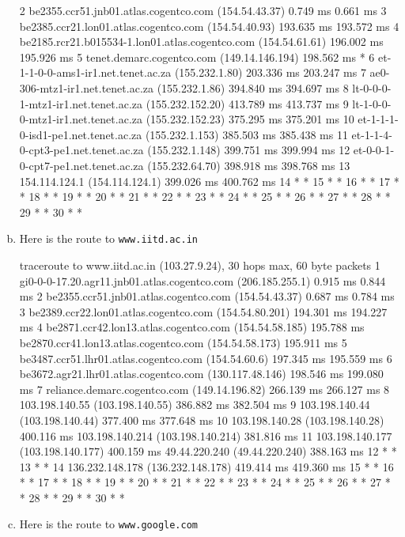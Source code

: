 \documentclass{article}
\begin{document}
\begin{enumerate}[a.]
\begin{code}
 2  be2355.ccr51.jnb01.atlas.cogentco.com (154.54.43.37)  0.749 ms  0.661 ms
 3  be2385.ccr21.lon01.atlas.cogentco.com (154.54.40.93)  193.635 ms  193.572 ms
 4  be2185.rcr21.b015534-1.lon01.atlas.cogentco.com (154.54.61.61)  196.002 ms  195.926 ms
 5  tenet.demarc.cogentco.com (149.14.146.194)  198.562 ms *
 6  et-1-1-0-0-ams1-ir1.net.tenet.ac.za (155.232.1.80)  203.336 ms  203.247 ms
 7  ae0-306-mtz1-ir1.net.tenet.ac.za (155.232.1.86)  394.840 ms  394.697 ms
 8  lt-0-0-0-1-mtz1-ir1.net.tenet.ac.za (155.232.152.20)  413.789 ms  413.737 ms
 9  lt-1-0-0-0-mtz1-ir1.net.tenet.ac.za (155.232.152.23)  375.295 ms  375.201 ms
10  et-1-1-1-0-isd1-pe1.net.tenet.ac.za (155.232.1.153)  385.503 ms  385.438 ms
11  et-1-1-4-0-cpt3-pe1.net.tenet.ac.za (155.232.1.148)  399.751 ms  399.994 ms
12  et-0-0-1-0-cpt7-pe1.net.tenet.ac.za (155.232.64.70)  398.918 ms  398.768 ms
13  154.114.124.1 (154.114.124.1)  399.026 ms  400.762 ms
14  * *
15  * *
16  * *
17  * *
18  * *
19  * *
20  * *
21  * *
22  * *
23  * *
24  * *
25  * *
26  * *
27  * *
28  * *
29  * *
30  * *
\end{code}
\item Here is the route to {\tt www.iitd.ac.in}
\begin{code}
traceroute to www.iitd.ac.in (103.27.9.24), 30 hops max, 60 byte packets
 1  gi0-0-0-17.20.agr11.jnb01.atlas.cogentco.com (206.185.255.1)  0.915 ms  0.844 ms
 2  be2355.ccr51.jnb01.atlas.cogentco.com (154.54.43.37)  0.687 ms  0.784 ms
 3  be2389.ccr22.lon01.atlas.cogentco.com (154.54.80.201)  194.301 ms  194.227 ms
 4  be2871.ccr42.lon13.atlas.cogentco.com (154.54.58.185)  195.788 ms be2870.ccr41.lon13.atlas.cogentco.com (154.54.58.173)  195.911 ms
 5  be3487.ccr51.lhr01.atlas.cogentco.com (154.54.60.6)  197.345 ms  195.559 ms
 6  be3672.agr21.lhr01.atlas.cogentco.com (130.117.48.146)  198.546 ms  199.080 ms
 7  reliance.demarc.cogentco.com (149.14.196.82)  266.139 ms  266.127 ms
 8  103.198.140.55 (103.198.140.55)  386.882 ms  382.504 ms
 9  103.198.140.44 (103.198.140.44)  377.400 ms  377.648 ms
10  103.198.140.28 (103.198.140.28)  400.116 ms 103.198.140.214 (103.198.140.214)  381.816 ms
11  103.198.140.177 (103.198.140.177)  400.159 ms 49.44.220.240 (49.44.220.240)  388.163 ms
12  * *
13  * *
14  136.232.148.178 (136.232.148.178)  419.414 ms  419.360 ms
15  * *
16  * *
17  * *
18  * *
19  * *
20  * *
21  * *
22  * *
23  * *
24  * *
25  * *
26  * *
27  * *
28  * *
29  * *
30  * *
\end{code}
\item Here is the route to {\tt www.google.com}
\begin{code}

\end{code}
\end{enumerate}
\end{document}
